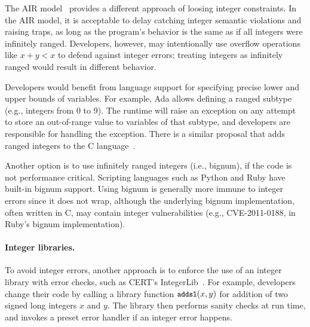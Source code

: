 The AIR model~\cite{air} provides a different approach of loosing
integer constraints.  In the AIR model, it is acceptable to delay
catching integer semantic violations and raising traps, as long as the program's
behavior is the same as if all integers were infinitely ranged.
Developers, however, may intentionally use overflow operations like
$x + y < x$ to defend against integer errors; treating integers as
infinitely ranged would result in different behavior.

Developers would benefit from language support for specifying precise
lower and upper bounds of variables.  For example, Ada allows
defining a ranged subtype (e.g., integers from 0 to 9).  The runtime
will raise an exception on any attempt to store an out-of-range
value to variables of that subtype, and developers are responsible
for handling the exception.  There is a similar proposal that adds
ranged integers to the C language~\cite{ranged-c}.

Another option is to use infinitely ranged integers (i.e., bignum),
if the code is not performance critical.  Scripting languages such
as Python and Ruby have built-in bignum support.  Using bignum is
generally more immune to integer errors since it does not wrap,
although the underlying bignum implementation, often written in C,
may contain integer vulnerabilities (e.g., CVE-2011-0188,
in Ruby's bignum implementation).
%


\paragraph{Integer libraries.}
To avoid integer errors, another approach is to enforce the use of
an integer library with error checks, such as CERT's
IntegerLib~\cite[INT03-C]{seacord:secure-c}.  For example, developers
change their code by calling a library function $\cc{addsl}(x, y)$
for addition of two signed long integers $x$ and $y$.  The library
then performs sanity checks at run time, and invokes a preset error
handler if an integer error happens.

